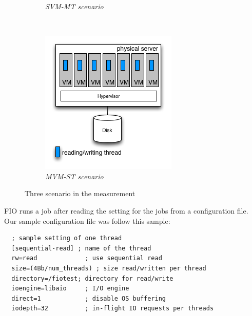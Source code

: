 \documentclass{acmsig}
\begin{document}
\begin{figure}[t]
\begin{subfigure}[b]{0.3\textwidth}
     \caption{\textit{SVM-MT scenario}}
     \label{fig:svm-mt}
   \end{subfigure}
    ~ %
   \begin{subfigure}[b]{0.3\textwidth}
     \includegraphics[width=\textwidth]{figures/MVM-ST.png}
     \caption{\textit{MVM-ST scenario}}
     \label{fig:mvm-st}
   \end{subfigure}
   \caption{Three scenario in the measurement}\label{fig:scenario}
\end{figure}

FIO runs a job after reading the setting for the jobs from a configuration file. Our sample configuration file was follow this sample:
\begin{lstlisting}
  ; sample setting of one thread
  [sequential-read] ; name of the thread
  rw=read             ; use sequential read
  size=(4Bb/num_threads) ; size read/written per thread
  directory=/fiotest; directory for read/write
  ioengine=libaio     ; I/O engine
  direct=1            ; disable OS buffering
  iodepth=32          ; in-flight IO requests per threads
\end{lstlisting}
\end{document}
